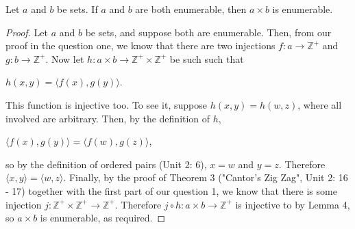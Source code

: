 \documentclass{article}
\begin{document}
\begin{lemma} Let $a$ and $b$ be sets. If $a$ and $b$ are both enumerable, then $a \times b$ is enumerable.\end{lemma}
\begin{proof}
Let $a$ and $b$ be sets, and suppose both are enumerable. Then, from our proof in the question one, we know that there are two injections $f: a \rightarrow \mathbb{Z^+}$ and $g: b \rightarrow \mathbb{Z^+}$. Now let $h: a \times b \rightarrow \mathbb{Z^+} \times \mathbb{Z^+}$ be such such that \begin{center} $h(x,y) = \langle f(x), g(y) \rangle$. \end{center} This function is injective too. To see it, suppose $h(x,y) = h(w,z)$, where all involved are arbitrary.  Then, by the definition of $h$, \begin{center} $\langle f(x), g(y) \rangle = \langle f(w), g(z) \rangle$, \end{center} so by the definition of ordered pairs (Unit 2: 6), $x = w$ and $y = z$. Therefore $\langle x,y \rangle = \langle w,z \rangle$. Finally, by the proof of Theorem 3 ("Cantor's Zig Zag", Unit 2: 16 - 17) together with the first part of our question 1, we know that there is some injection $j : \mathbb{Z^+} \times \mathbb{Z^+} \rightarrow \mathbb{Z^+}$. Therefore $j \circ h: a \times b \rightarrow \mathbb{Z^+}$ is injective to by Lemma 4, so $a \times b$ is enumerable, as required. 
\end{proof}
\end{document}

